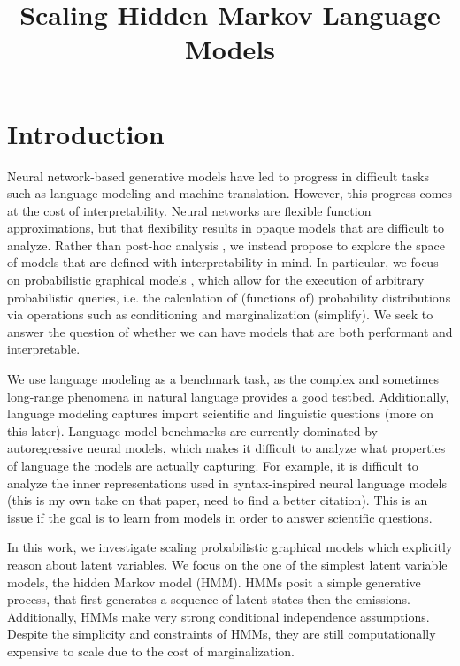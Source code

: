\documentclass{article}
\title{Scaling Hidden Markov Language Models}
\begin{document}
\maketitle


\section{Introduction}
Neural network-based generative models have led to progress in
difficult tasks such as language modeling and machine translation.
However, this progress comes at the cost of interpretability.
Neural networks are flexible function approximations,
but that flexibility results in opaque models that are difficult to analyze.
Rather than post-hoc analysis \citep{probing}, we instead propose to explore
the space of models that are defined with interpretability in mind.
In particular, we focus on probabilistic graphical models \citep{},
which allow for the execution of arbitrary probabilistic queries,
i.e. the calculation of (functions of) probability distributions
via operations such as conditioning and marginalization \citep{koller} (simplify).
We seek to answer the question of whether we can have models that are both
performant and interpretable.

We use language modeling as a benchmark task, as the complex 
and sometimes long-range phenomena in natural language provides a good testbed.
Additionally, language modeling captures import scientific and linguistic questions
(more on this later).
Language model benchmarks are currently dominated by autoregressive neural models,
which makes it difficult to analyze what properties of language the models are
actually capturing.
For example, it is difficult to analyze the inner representations used
in syntax-inspired neural language models \citep{du2020exploiting}
(this is my own take on that paper,
need to find a better citation). 
This is an issue if the goal is to learn from models in order to answer
scientific questions.

In this work, we investigate scaling probabilistic graphical models
which explicitly reason about latent variables.
We focus on the one of the simplest latent variable models,
the hidden Markov model (HMM).
HMMs posit a simple generative process, that first generates a sequence of
latent states then the emissions.
Additionally, HMMs make very strong conditional independence assumptions.
Despite the simplicity and constraints of HMMs,
they are still computationally expensive to scale
due to the cost of marginalization.
\end{document}
